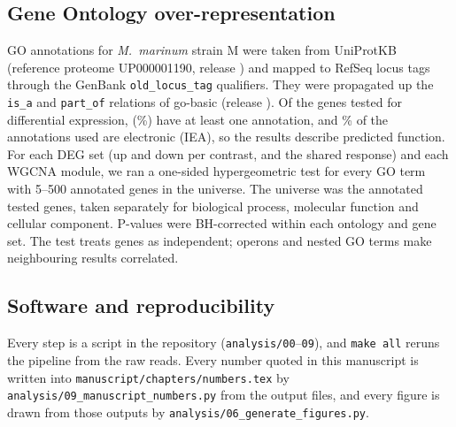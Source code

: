 \subsection*{Gene Ontology over-representation}
GO annotations for \textit{M.~marinum} strain M were taken from UniProtKB (reference proteome UP000001190, release \uniprotRelease{}) and mapped to RefSeq locus tags through the GenBank \texttt{old\_locus\_tag} qualifiers. They were propagated up the \texttt{is\_a} and \texttt{part\_of} relations of go-basic (release \goRelease{}). Of the \goTestedGenes{} genes tested for differential expression, \goAnnotatedGenes{} (\goAnnotatedPct\%) have at least one annotation, and \goIeaPct\% of the annotations used are electronic (IEA), so the results describe predicted function. For each DEG set (up and down per contrast, and the shared response) and each WGCNA module, we ran a one-sided hypergeometric test for every GO term with 5--500 annotated genes in the universe. The universe was the annotated tested genes, taken separately for biological process, molecular function and cellular component. P-values were BH-corrected within each ontology and gene set. The test treats genes as independent; operons and nested GO terms make neighbouring results correlated.



\subsection*{Software and reproducibility}
Every step is a script in the repository (\texttt{analysis/00}--\texttt{09}), and \texttt{make all} reruns the pipeline from the raw reads. Every number quoted in this manuscript is written into \texttt{manuscript/chapters/numbers.tex} by \texttt{analysis/09\_manuscript\_numbers.py} from the output files, and every figure is drawn from those outputs by \texttt{analysis/06\_generate\_figures.py}.
